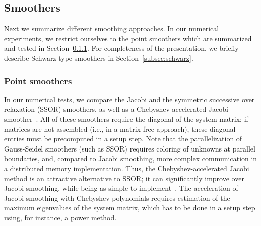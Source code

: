 \documentclass[smallcondensed,final]{svjour3}     %
\begin{document}




\subsection{Smoothers}\label{subsec:smoothers}
Next we summarize different smoothing approaches. In our numerical
experiments, we restrict ourselves to the point smoothers which are
summarized and tested in Section~\ref{subsec:ptsmoothers}. For
completeness of the presentation, we briefly describe Schwarz-type
smoothers in Section~\ref{subsec:schwarz}.


\subsubsection{Point smoothers}\label{subsec:ptsmoothers}
In our numerical tests, we compare the Jacobi and the symmetric
successive over relaxation (SSOR) smoothers, as well as a
Chebyshev-accelerated Jacobi smoother~\cite{Brandt77}. All of these
smoothers require the diagonal of the system matrix; if matrices are
not assembled (i.e., in a matrix-free approach), these diagonal
entries must be precomputed in a setup step.  Note that the
parallelization of Gauss-Seidel smoothers (such as SSOR) requires
coloring of unknowns at parallel boundaries, and, compared to Jacobi
smoothing, more complex communication in a distributed memory
implementation. Thus, the Chebyshev-accelerated Jacobi method is an
attractive alternative to SSOR; it can significantly improve over
Jacobi smoothing, while being as simple to
implement~\cite{AdamsBrezinaHuEtAl03}. The acceleration of Jacobi
smoothing with Chebyshev polynomials requires estimation of the
maximum eigenvalues of the system matrix, which has to be done in a
setup step using, for instance, a power method.
\end{document}
